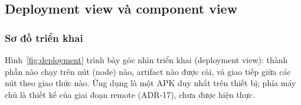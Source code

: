 \subsection{Deployment view và component view}
\label{sec:deployment-component}

\subsubsection{Sơ đồ triển khai}
\label{sec:deployment}

Hình~\ref{fig:deployment} trình bày góc nhìn triển khai (deployment view): thành phần nào chạy trên nút (node) nào, artifact nào được cài, và giao tiếp giữa các nút theo giao thức nào. Ứng dụng là một APK duy nhất trên thiết bị; phía máy chủ là thiết kế của giai đoạn remote (ADR-17), chưa được hiện thực.

